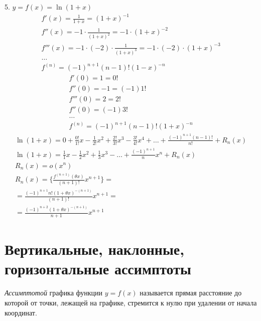 5. $y = f(x) = \ln(1 + x)$
\begin{gather*}
  f'(x) = \frac{1}{1+x} = (1 + x)^{-1} \\
  f''(x) = -1 \cdot \frac{1}{(1+x)^2} = -1 \cdot (1 + x)^{-2} \\
  f'''(x) = -1 \cdot (-2) \cdot \frac{1}{(1+x)^3} = -1 \cdot (-2) \cdot (1 + x)^{-3} \\
  \ldots \\
  f^{(n)} = (-1)^{n+1}(n-1)!(1-x)^{-n} 
\end{gather*}
\begin{gather*}
  f'(0) = 1 = 0! \\
  f''(0) = -1 = (-1) 1! \\
  f'''(0) = 2 = 2! \\
  f''(0) = (-1) 3! \\
  \ldots \\
  f^{(n)} = (-1)^{n+1}(n-1)!(1+x)^{-n}
\end{gather*}
\begin{gather*}
  \ln(1+x) = 0 + \frac{0!}{1!} x - \frac{1}{2!} x^2 + \frac{2!}{3!} x^{3} - \frac{3!}{4!} x^{4} + \ldots + \frac{(-1)^{n+1}(n-1)!}{n!} + R_n(x) \\
  \ln(1+x) = \frac{1}{1}x - \frac{1}{2}x^2 + \frac{1}{3}x^{3} - \ldots + \frac{(-1)^{n+1}}{n}x^n + R_n(x) \\
  R_n(x) = o(x^{n}) \\
  R_n(x) = \{ \frac{f^{(n+1)}(\theta x)}{(n+1)!}x^{n+1} \} = \\
  = \frac{(-1)^{n+1}n! (1 + \theta x)^{-(n+1)}}{(n+1)!}x^{n+1} = \\
  = \frac{(-1)^{n+2}(1+\theta x)^{-(n+1)}}{n+1} x^{n+1}
\end{gather*}

\section{Вертикальные, наклонные, горизонтальные ассимптоты}

\begin{definition}
  \textit{Ассимптотой} графика функции $y = f(x)$ называется прямая расстояние до которой от точки, лежащей на графике, стремится к нулю при удалении от начала координат.
\end{definition}

